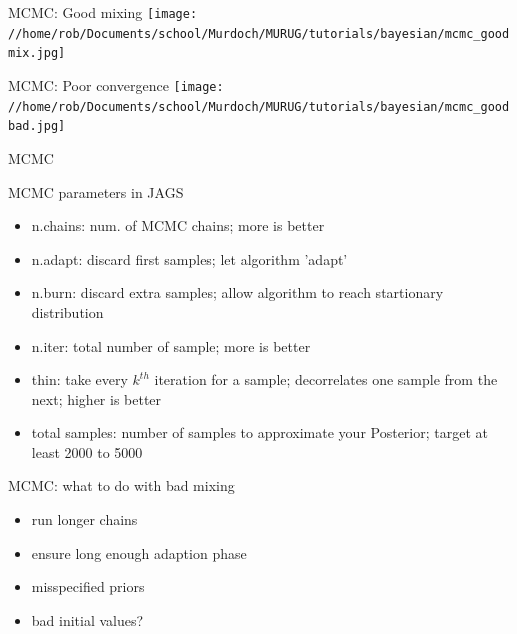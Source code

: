 \documentclass[presentation]{beamer}
\begin{document}
\begin{frame}[label=sec-33]{MCMC: Good mixing}
\texttt{[image: //home/rob/Documents/school/Murdoch/MURUG/tutorials/bayesian/mcmc\_goodmix.jpg]}
\end{frame}

\begin{frame}[label=sec-34]{MCMC: Poor convergence}
\texttt{[image: //home/rob/Documents/school/Murdoch/MURUG/tutorials/bayesian/mcmc\_goodbad.jpg]}
\end{frame}

\begin{frame}[label=sec-35]{MCMC}
\begin{block}{MCMC parameters in JAGS}
\begin{itemize}
\item n.chains: num. of MCMC chains; more is better
\item n.adapt: discard first samples; let algorithm 'adapt'
\item n.burn: discard extra samples; allow algorithm to reach startionary distribution
\item n.iter: total number of sample; more is better
\item thin: take every $k^{th}$ iteration for a sample; decorrelates one sample from the next; higher is better
\item total samples: number of samples to approximate your Posterior; target at least 2000 to 5000
\end{itemize}
\end{block}
\end{frame}

\begin{frame}[label=sec-36]{MCMC: what to do with bad mixing}
\begin{itemize}
\item run longer chains
\item ensure long enough adaption phase
\item misspecified priors
\item bad initial values?
\end{itemize}
\end{frame}
\end{document}
